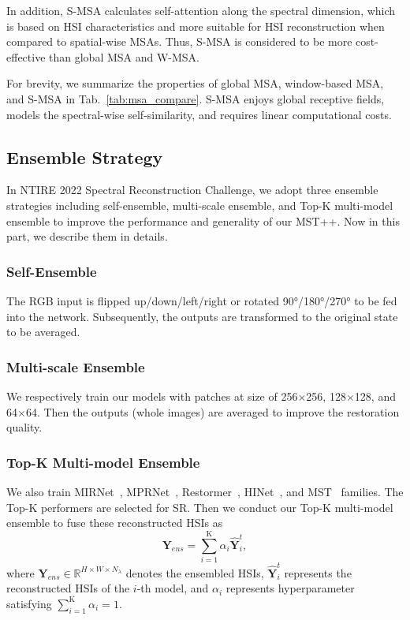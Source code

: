 \documentclass[10pt,twocolumn,letterpaper]{article}
\begin{document}
In addition, S-MSA calculates self-attention along the spectral dimension, which is based on HSI characteristics and more suitable for HSI reconstruction when compared to spatial-wise MSAs. Thus, S-MSA is considered to be more cost-effective than global MSA and W-MSA.

For brevity, we summarize the properties of global MSA, window-based MSA, and  S-MSA in Tab.~\ref{tab:msa_compare}. S-MSA enjoys global receptive fields, models the spectral-wise self-similarity, and requires linear computational costs.


\subsection{Ensemble Strategy}
\label{sec:ensemble}
In NTIRE 2022 Spectral Reconstruction Challenge, we adopt three ensemble strategies including self-ensemble, multi-scale ensemble, and Top-K multi-model ensemble to improve the performance and generality of our MST++. Now in this part, we describe them in details.

\subsubsection{Self-Ensemble}
The RGB input is flipped up/down/left/right or rotated 90°/180°/270° to be fed into the network. Subsequently, the outputs are transformed to the original state to be averaged. 

\subsubsection{Multi-scale Ensemble}
We respectively train our models with patches at size of 256$\times$256, 128$\times$128, and 64$\times$64. Then the outputs (whole images) are averaged to improve the restoration quality.

\subsubsection{Top-K Multi-model Ensemble}
We also train MIRNet~\cite{mirnet}, MPRNet~\cite{mprnet}, Restormer~\cite{restormer}, HINet~\cite{hinet}, and MST~\cite{mst} families. The Top-K performers are selected for SR. Then we conduct our Top-K multi-model ensemble to fuse these reconstructed HSIs as
\begin{equation}
\mathbf{Y}_{ens} = \sum_{i=1}^{\text{K}} \alpha_i \mathbf{\hat{Y}}^t_i,
\end{equation}
where $\mathbf{Y}_{ens} \in \mathbb{R}^{H\times W\times N_{\lambda}}$ denotes the ensembled HSIs, $\mathbf{\hat{Y}}^t_i$ represents the reconstructed HSIs of the $i$-th model, and $\alpha_i$ represents hyperparameter satisfying $\sum_{i=1}^{\text{K}} \alpha_i = 1$. 
\end{document}
